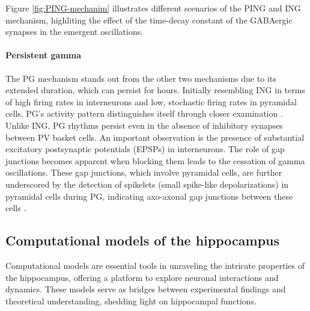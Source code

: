 \documentclass[../main.tex]{subfiles}
\begin{document}
Figure \ref{fig:PING-mechanim} illustrates different scenarios of the PING and ING mechanism, highliting the effect of the time-decay constant of the GABAergic synapses in the emergent oscillations.
\paragraph{Persistent gamma}
The PG mechanism stands out from the other two mechanisms due to its extended duration, which can persist for hours. 
Initially resembling ING in terms of high firing rates in interneurons and low, stochastic firing rates in pyramidal cells, PG's activity pattern distinguishes itself through closer examination \citep{kopell2002mechanisms,whittington2011multiple}.
Unlike ING, PG rhythms persist even in the absence of inhibitory synapses between PV basket cells.
An important observation is the presence of substantial excitatory postsynaptic potentials (EPSPs) in interneurons.
The role of gap junctions becomes apparent when blocking them leads to the cessation of gamma oscillations.
These gap junctions, which involve pyramidal cells, are further underscored by the detection of spikelets (small spike-like depolarizations) in pyramidal cells during PG, indicating axo-axonal gap junctions between these cells \citep{jaeger_hippocampal_2013}.
\subsection{Computational models of the hippocampus}
Computational models are essential tools in unraveling the intricate properties of the hippocampus, offering a platform to explore neuronal interactions and dynamics.
These models serve as bridges between experimental findings and theoretical understanding, shedding light on hippocampal functions.
\end{document}
